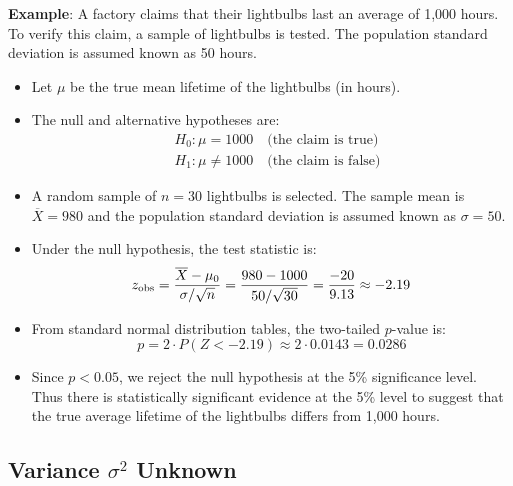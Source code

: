 \documentclass[twoside]{book}
\begin{document}
\textbf{Example}: A factory claims that their lightbulbs last an average of 1,000 hours. To verify this claim, a sample of lightbulbs is tested. The population standard deviation is assumed known as 50 hours.

\begin{itemize}
	\item Let \(\mu\) be the true mean lifetime of the lightbulbs (in hours).

	\item The null and alternative hypotheses are:
	\begin{align*}
	&H_0: \mu = 1000 \quad \text{(the claim is true)} \\
	&H_1: \mu \neq 1000 \quad \text{(the claim is false)}
	\end{align*}

	\item A random sample of \(n = 30\) lightbulbs is selected. The sample mean is \(\overline{X} = 980\) and the population standard deviation is assumed known as \(\sigma = 50\).

	\item Under the null hypothesis, the test statistic is:
	\[
	z_{\rm obs} = \dfrac{\overline{X} - \mu_0}{\sigma / \sqrt{n}} 
	= \frac{980 - 1000}{50 / \sqrt{30}} 
	= \frac{-20}{9.13} \approx -2.19
	\]

	\item From standard normal distribution tables, the two-tailed \(p\)-value is:
	\[
	p = 2 \cdot P(Z < -2.19) \approx 2 \cdot 0.0143 = 0.0286
	\]

	\item Since \(p < 0.05\), we reject the null hypothesis at the 5\% significance level. Thus there is statistically significant evidence at the 5\% level to suggest that the true average lifetime of the lightbulbs differs from 1,000 hours.
\end{itemize}


\subsection{Variance $\sigma^2 $ Unknown}
\end{document}
